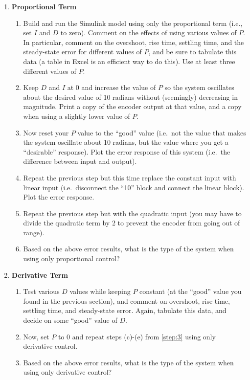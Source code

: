 \begin{enumerate}
    \item \textbf{Proportional Term}\label{step:3} \begin{enumerate}
              \item Build and run the \textsf{Simulink} model using only the
                    proportional term (i.e., set \(I\) and
                    \(D\) to zero). Comment on the effects of using various values of \(P\).
                    In particular, comment on the overshoot, rise time, settling time, and the
                    steady-state error for different values of \(P\), and be sure to tabulate this data (a table in Excel is an efficient way to do this). Use at least three different values of \(P\).

              \item Keep \(D\) and \(I\) at 0 and increase the value of \(P\) so the
                    system oscillates about the desired value of 10 radians without (seemingly)
                    decreasing in magnitude. Print a copy of the encoder output at that value, and a copy when using a slightly lower value of \(P\).

              \item Now reset your \(P\) value to the ``good'' value (i.e.\ not the value that makes
                    the system oscillate about 10 radians, but the value where you get a ``desirable'' response). Plot the error response of this system (i.e.\ the difference between input and output).
              \item Repeat the previous step but this time replace the constant input with linear input (i.e.\ disconnect the ``10'' block and connect the linear block). Plot the error response.
              \item Repeat the previous step but with the quadratic input (you may have to divide the quadratic term by 2 to prevent the encoder from going out of range).
              \item Based on the above error results, what is the type of the system when using only proportional control?
          \end{enumerate}

    \item \textbf{Derivative Term}\label{step:4} \begin{enumerate}
              \item Test various \(D\) values while keeping \(P\) constant (at the ``good'' value you found in the previous section), and comment on overshoot, rise time, settling time, and steady-state error. Again, tabulate this data, and decide on some ``good'' value of \(D\).
              \item Now, set \(P\) to 0 and repeat steps (c)-(e) from \ref{step:3} using only derivative control.
              \item Based on the above error results, what is the type of the system when using only derivative control?
          \end{enumerate}


\end{enumerate}
